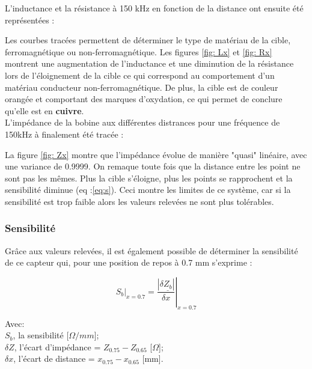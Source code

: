 L'inductance et la résistance à 150 kHz en fonction de la distance ont ensuite été représentées :


Les courbes tracées permettent de déterminer le type de matériau de la cible, ferromagnétique ou 
non-ferromagnétique. Les figures \ref{fig: Lx} et \ref{fig: Rx} montrent une augmentation de 
l'inductance et une diminution de la résistance lors de l'éloignement de la cible ce qui correspond 
au comportement d'un matériau conducteur non-ferromagnétique. 
De plus, la cible est de couleur orangée et comportant des marques d'oxydation, ce qui permet 
de conclure qu'elle est en \textbf{cuivre}.\\  



L'impédance de la bobine aux différentes distrances pour une fréquence de 150kHz à finalement été tracée :


La figure \ref{fig: Zx} montre que l'impédance évolue de manière "quasi" linéaire, avec une 
variance de 0.9999. On remaque toute fois que la distance entre les point ne sont pas les mêmes. 
Plus la cible s'éloigne, plus les points se rapprochent et la sensibilité diminue (eq :\ref{eq:s}).
Ceci montre les limites de ce système, car si la sensibilité est trop faible alors les valeurs relevées
ne sont plus tolérables.
\subsubsection{Sensibilité}

Grâce aux valeurs relevées, il est également possible de déterminer la sensibilité de
ce capteur qui, pour une position de repos à 0.7 mm s'exprime : 

\begin{equation}\label{eq:s}
    \left . S_b \right |_{x=0.7} = \left . \frac{\left | \delta \underline{Z_b}\right |}{\delta x} \right |_{x=0.7}
\end{equation}

Avec: \\
$S_b$, la sensibilité [$\Omega/mm$];\\
$\delta Z$, l'écart d'impédance = $Z_{0.75} - Z_{0.65}$ [$\Omega$];\\
$\delta x$, l'écart de distance  = $x_{0.75} - x_{0.65}$ [mm].



